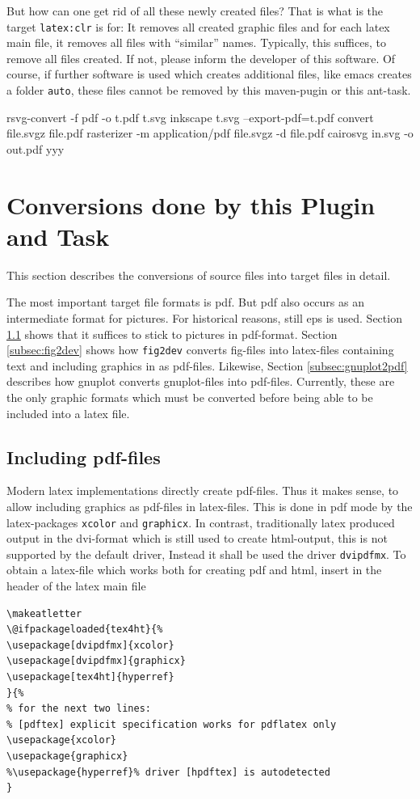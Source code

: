 \documentclass[12pt]{article}
\begin{document}
But how can one get rid of all these newly created files? 
That is what is the target {\tt latex:clr} is for: 
It removes all created graphic files 
and for each latex main file, it removes all files with ``similar'' names. 
Typically, this suffices, to remove all files created. 
If not, please inform the developer of this software. 
Of course, if further software is used which creates additional files, 
like emacs creates a folder {\tt auto}, 
these files cannot be removed by this maven-pugin or this ant-task. 


rsvg-convert -f pdf -o t.pdf t.svg
inkscape t.svg --export-pdf=t.pdf
convert file.svgz file.pdf 
rasterizer -m application/pdf file.svgz -d file.pdf
cairosvg in.svg -o out.pdf
yyy

\section{Conversions done by this Plugin and Task}\label{sec:conversions}

This section describes the conversions of source files into target files 
in detail. 

The most important target file formats is \gls{pdf}. 
But pdf also occurs as an intermediate format for pictures. 
For historical reasons, still \gls{eps} is used. 
Section \ref{subsec:figpdf} shows that it suffices to stick to pictures 
in pdf-format. 
Section \ref{subsec:fig2dev} shows how {\tt fig2dev} converts fig-files 
into latex-files containing text and including graphics in as pdf-files. 
Likewise, Section \ref{subsec:gnuplot2pdf} describes 
how gnuplot converts gnuplot-files into pdf-files. 
Currently, these are the only graphic formats which must be converted 
before being able to be included into a latex file. 



\subsection{Including pdf-files}\label{subsec:figpdf}

Modern latex implementations directly create pdf-files. 
Thus it makes sense, to allow including graphics as pdf-files 
in latex-files. 
This is done in pdf mode 
by the latex-packages {\tt xcolor} and {\tt graphicx}. 
In contrast, traditionally latex produced output in the \gls{dvi}-format 
which is still used to create \gls{html}-output, 
this is not supported by the default driver, 
Instead it shall be used the driver {\tt dvipdfmx}. 
To obtain a latex-file which works both for creating pdf and html, 
insert in the header of the latex main file 
%
\lstset{language=tex, basicstyle=\small}
\begin{lstlisting}
\makeatletter
\@ifpackageloaded{tex4ht}{%
\usepackage[dvipdfmx]{xcolor}
\usepackage[dvipdfmx]{graphicx}
\usepackage[tex4ht]{hyperref}
}{%
% for the next two lines: 
% [pdftex] explicit specification works for pdflatex only 
\usepackage{xcolor}
\usepackage{graphicx}
%\usepackage{hyperref}% driver [hpdftex] is autodetected 
}
\end{lstlisting}
\end{document}
